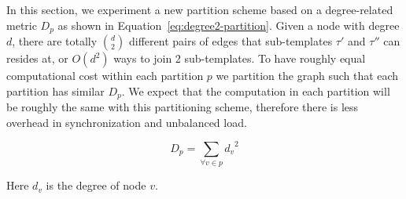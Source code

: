 In this section, we experiment a new partition scheme based on a degree-related
metric $D_p$ as shown in Equation~\ref{eq:degree2-partition}. Given a node with
degree $d$, there are totally $d \choose 2$ different pairs of edges that
sub-templates $\tau'$ and $\tau''$ can resides at, or $O(d^2)$ ways to join 2
sub-templates. To have roughly equal computational cost within each partition
$p$ we partition the graph such that each partition has similar $D_p$. We expect
that the computation in each partition will be roughly the same with this
partitioning scheme, therefore there is less overhead in synchronization and
unbalanced load.

\begin{equation}
\label{eq:degree2-partition}
\displaystyle D_p = \sum_{\forall v \in p}{{d_v}^2}
\end{equation}

Here $d_v$ is the degree of node $v$. 


